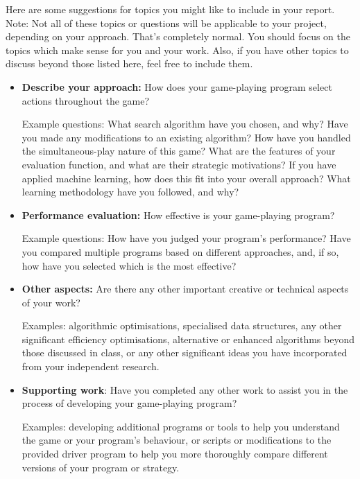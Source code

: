 \documentclass[]{article}
\begin{document}
Here are some suggestions for topics you might like to include in your
report.
%
Note: Not all of these topics or questions will be applicable to your
project, depending on your approach. That's completely normal. You should
focus on the topics which make sense for you and your work.
Also, if you have other topics to discuss beyond those listed here,
feel free to include them.
%
\begin{itemize}
    \item
        \textbf{Describe your approach:}
        How does your game-playing program select actions throughout the
        game?

        Example questions:
        What search algorithm have you chosen, and why?
        Have you made any modifications to an existing algorithm?
        How have you handled the simultaneous-play nature of this game?
        What are the features of your evaluation function, and
        what are their strategic motivations?
        If you have applied machine learning, how does this fit into
        your overall approach? What learning methodology have you followed,
        and why?
    \item
        \textbf{Performance evaluation:}
        How effective is your game-playing program?

        Example questions:
        How have you judged your program's performance? Have you compared
        multiple programs based on different approaches, and, if so, how
        have you selected which is the most effective?
    \item
        \textbf{Other aspects:}
        Are there any other important creative or technical aspects of
        your work?

        Examples:
        algorithmic optimisations,
        specialised data structures,
        any other significant efficiency optimisations,
        alternative or enhanced algorithms beyond those discussed
        in class,
        or
        any other significant ideas you have incorporated from your
        independent research.
    \item
        \textbf{Supporting work}: Have you completed any other work to
        assist you in the process of developing your game-playing program?

        Examples:
        developing additional programs or tools to help you
        understand the game or your program's behaviour,
        or
        scripts or modifications to the provided driver program
        to help you more thoroughly compare different versions of
        your program or strategy.
\end{itemize}
\end{document}
